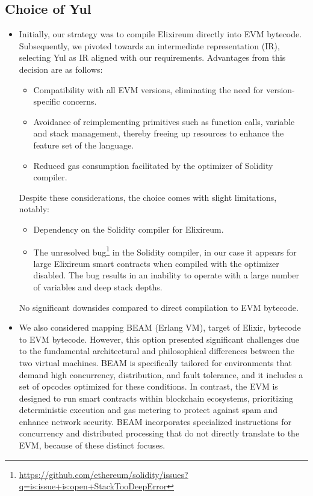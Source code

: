 \subsection{Choice of Yul}
\begin{itemize}
    \item Initially, our strategy was to compile Elixireum directly into EVM bytecode. Subsequently, we pivoted towards an intermediate representation (IR), selecting Yul as IR aligned with our requirements. Advantages from this decision are as follows:
        \begin{itemize}
            \item Compatibility with all EVM versions, eliminating the need for version-specific concerns. 
            \item Avoidance of reimplementing primitives such as function calls, variable and stack management, thereby freeing up resources to enhance the feature set of the language.
            \item Reduced gas consumption facilitated by the optimizer of Solidity compiler.
        \end{itemize}
      Despite these considerations, the choice comes with slight limitations, notably:
        \begin{itemize}
            \item Dependency on the Solidity compiler for Elixireum.
            \item The unresolved bug\footnote{\href{https://github.com/ethereum/solidity/issues?q=is:issue+is:open+StackTooDeepError}{https://github.com/ethereum/solidity/issues?q=is:issue+is:open+StackTooDeepError}} in the Solidity compiler, in our case it appears for large Elixireum smart contracts when compiled with the optimizer disabled. The bug results in an inability to operate with a large number of variables and deep stack depths.
        \end{itemize}
      No significant downsides compared to direct compilation to EVM bytecode.

    \item We also considered mapping BEAM (Erlang VM), target of Elixir, bytecode to EVM bytecode. However, this option presented significant challenges due to the fundamental architectural and philosophical differences between the two virtual machines. BEAM is specifically tailored for environments that demand high concurrency, distribution, and fault tolerance, and it includes a set of opcodes optimized for these conditions. In contrast, the EVM is designed to run smart contracts within blockchain ecosystems, prioritizing deterministic execution and gas metering to protect against spam and enhance network security. BEAM incorporates specialized instructions for concurrency and distributed processing that do not directly translate to the EVM, because of these distinct focuses.
\end{itemize}


